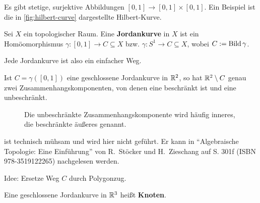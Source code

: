 \begin{beispiel}%
    Es gibt stetige, surjektive Abbildungen 
    $[0,1] \rightarrow [0,1] \times [0,1]$. Ein Beispiel ist die
    in \cref{fig:hilbert-curve} dargestellte Hilbert-Kurve.

    
\end{beispiel}

\begin{definition}%
    Sei $X$ ein topologischer Raum. Eine
    \textbf{Jordankurve} in $X$ ist ein Homöomorphismus 
    $\gamma: [0,1] \rightarrow C \subseteq X$ bzw.
    $\gamma: S^1 \rightarrow C \subseteq X$, wobei $C := \operatorname{Bild}{\gamma}$.
\end{definition}

Jede Jordankurve ist also ein einfacher Weg.

\begin{satz}
    Ist $C=\gamma([0,1])$ eine geschlossene Jordankurve in $\mathbb{R}^2$,
    so hat $\mathbb{R}^2 \setminus C$ genau zwei Zusammenhangskomponenten,
    von denen eine beschränkt ist und eine unbeschränkt.
\end{satz}

\begin{figure}[htp]
    \centering
     
    \label{fig:jordan-kurvensatz}
    \caption{Die unbeschränkte Zusammenhangskomponente wird häufig inneres, die beschränkte äußeres genannt.}
\end{figure}

\begin{beweis}
    ist technisch mühsam und wird hier nicht geführt. Er kann
    in \enquote{Algebraische Topologie: Eine Einführung} von R.~Stöcker
    und H.~Zieschang auf S. 301f (ISBN 978-3519122265) nachgelesen werden.

    Idee: Ersetze Weg $C$ durch Polygonzug.
\end{beweis}

\begin{definition}%
    Eine geschlossene Jordankurve in $\mathbb{R}^3$ heißt \textbf{Knoten}.
\end{definition}

